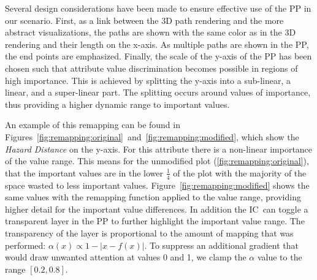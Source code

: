 \documentclass{egpubl}
\def\IC{IC}
\begin{document}
Several design considerations have been made to ensure effective use of the PP in our scenario. First, as a link between the 3D path rendering and the more abstract visualizations, the paths are shown with the same color as in the 3D rendering and their length on the x-axis. As multiple paths are shown in the PP, the end points are emphasized. Finally, the scale of the y-axis of the PP has been chosen such that attribute value discrimination becomes possible in regions of high importance. This is achieved by splitting the y-axis into a sub-linear, a linear, and a super-linear part. The splitting occurs around values of importance, thus providing a higher dynamic range to important values.

%

An example of this remapping can be found in Figures~\ref{fig:remapping:original}~and~\ref{fig:remapping:modified}, which show the \emph{Hazard Distance} on the y-axis. For this attribute there is a non-linear importance of the value range. This means for the unmodified plot (\ref{fig:remapping:original}), that the important values are in the lower $\frac{1}{4}$ of the plot with the majority of the space wasted to less important values. Figure~\ref{fig:remapping:modified} shows the same values with the remapping function applied to the value range, providing higher detail for the important value differences. In addition the \IC\ can toggle a transparent layer in the PP to further highlight the important value range. The transparency of the layer is proportional to the amount of mapping that was performed: $\alpha(x) \propto 1 - \left| x - f(x) \right|$. To suppress an additional gradient that would draw unwanted attention at values 0 and 1, we clamp the $\alpha$ value to the range $[0.2,0.8]$.
\end{document}
